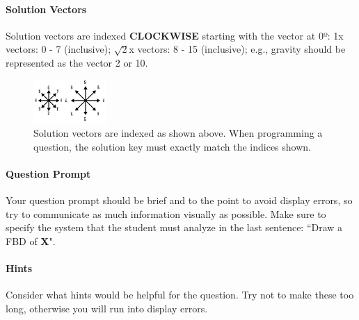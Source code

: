 \documentclass[12pt]{article}
\begin{document}
\paragraph{Solution Vectors}
Solution vectors are indexed \textbf{CLOCKWISE} starting with the vector at 0º: 1x vectors: 0 - 7 (inclusive); $\sqrt{2}$x vectors: 8 - 15 (inclusive); e.g., gravity should be represented as the vector 2 or 10.
\begin{figure}[H]
    \centering
    \includegraphics[width=0.25\textwidth]{solutionVEctors.png}
    \caption{Solution vectors are indexed as shown above. When programming a question, the solution key must exactly match the indices shown.}
\end{figure}

\paragraph{Question Prompt}
Your question prompt should be brief and to the point to avoid display errors, so try to communicate as much information visually as possible. Make sure to specify the system that the student must analyze in the last sentence: ``Draw a FBD of \textbf{X}".

\paragraph{Hints}
Consider what hints would be helpful for the question. Try not to make these too long, otherwise you will run into display errors.
\end{document}
